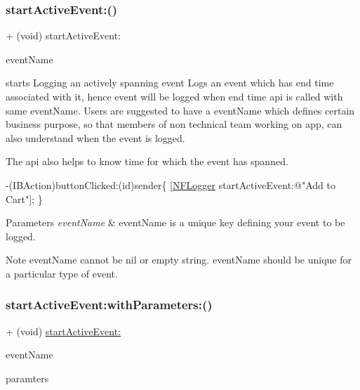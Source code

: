 \subsubsection{\texorpdfstring{start\+Active\+Event\+:()}{startActiveEvent:()}}
{\footnotesize\ttfamily + (void) start\+Active\+Event\+: \begin{DoxyParamCaption}\item[{(N\+S\+String $\ast$)}]{event\+Name }\end{DoxyParamCaption}}



starts Logging an actively spanning event Logs an event which has end time associated with it, hence event will be logged when end time api is called with same event\+Name. Users are suggested to have a event\+Name which defines certain business purpose, so that members of non technical team working on app, can also understand when the event is logged. 

The api also helps to know time for which the event has spanned.


\begin{DoxyCode}
-(IBAction)buttonClicked:(\textcolor{keywordtype}{id})sender\{
 [\hyperlink{interface_n_f_logger}{NFLogger} startActiveEvent:\textcolor{stringliteral}{@"Add to Cart"}];
\}
\end{DoxyCode}
 
\begin{DoxyParams}{Parameters}
{\em event\+Name} & event\+Name is a unique key defining your event to be logged. \\
\hline
\end{DoxyParams}
\begin{DoxyNote}{Note}
event\+Name cannot be nil or empty string. event\+Name should be unique for a particular type of event. 
\end{DoxyNote}
\mbox{\label{interface_n_f_logger_a415def4182d5d458ff013bacb1320857}} 
\subsubsection{\texorpdfstring{start\+Active\+Event\+:with\+Parameters\+:()}{startActiveEvent:withParameters:()}}
{\footnotesize\ttfamily + (void) \hyperlink{interface_n_f_logger_a2d98749d91d892500fab101747d06a71}{start\+Active\+Event\+:} \begin{DoxyParamCaption}\item[{(N\+S\+String $\ast$)}]{event\+Name }\item[{withParameters:(N\+S\+Dictionary $\ast$)}]{paramters }\end{DoxyParamCaption}}



